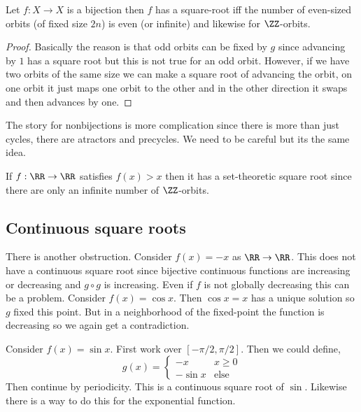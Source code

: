\documentclass[12pt]{article}
\begin{document}
\begin{prop}
Let $f : X \to X$ is a bijection then $f$ has a square-root iff the number of even-sized orbits (of fixed size $2n$) is even (or infinite) and likewise for $\ZZ$-orbits.
\end{prop}

\begin{proof}
Basically the reason is that odd orbits can be fixed by $g$ since advancing by $1$ has a square root but this is not true for an odd orbit. However, if we have two orbits of the same size we can make a square root of advancing the orbit, on one orbit it just maps one orbit to the other and in the other direction it swaps and then advances by one.
\end{proof}

\begin{rmk}
The story for nonbijections is more complication since there is more than just cycles, there are atractors and precycles. We need to be careful but its the same idea.
\end{rmk}

\begin{example}
If $f : \RR \to \RR$ satisfies $f(x) > x$ then it has a set-theoretic square root since there are only an infinite number of $\ZZ$-orbits.
\end{example}

\subsection{Continuous square roots}

There is another obstruction. Consider $f(x) = -x$ as $\RR \to \RR$. This does not have a continuous square root since bijective continuous functions are increasing or decreasing and $g \circ g$ is increasing. Even if $f$ is not globally decreasing this can be a problem. Consider $f(x) = \cos{x}$. Then $\cos{x} = x$ has a unique solution so $g$ fixed this point. But in a neighborhood of the fixed-point the function is decreasing so we again get a contradiction. 

\begin{example}
Consider $f(x) = \sin{x}$. First work over $[-\pi/2, \pi/2]$. Then we could define,
\[ g(x) = 
\begin{cases}
-x & x \ge 0
\\
-\sin{x} & \text{else}
\end{cases} \]
Then continue by periodicity. This is a continuous square root of $\sin$. Likewise there is a way to do this for the exponential function. 
\end{example}
\end{document}
